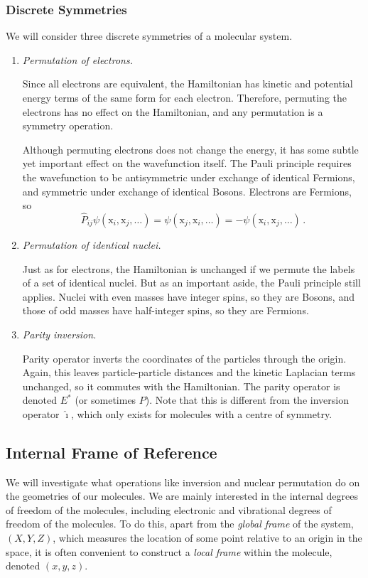 \documentclass{article}
\theoremstyle{plain}\theoremheaderfont{\normalfont\itshape}\theorembodyfont{\rmfamily}\theoremseparator{.}\newtheorem*{rem}{Remark}\newtheorem*{ex}{Example}\newtheorem*{proof}{Proof}\newtheorem*{altp}{Alternative proof}
\theoremstyle{plain}\theoremheaderfont{\normalfont\bfseries}\theorembodyfont{\rmfamily}\theoremseparator{.}\newtheorem{thm}{Theorem}[section]\newtheorem{lem}[thm]{Lemma}\newtheorem{prop}[thm]{Proposition}\newtheorem*{cor}{Corollary}\newtheorem{defn}[thm]{Definition}\newtheorem{clm}[thm]{Claim}\newtheorem{clminproof}{Claim}\newtheorem*{law}{Law}\newtheorem{pos}[thm]{Postulate}
\theoremstyle{break}\theoremheaderfont{\normalfont\itshape}\theorembodyfont{\rmfamily}\theoremseparator{.\medskip}\newtheorem*{proofskip}{Proof}\newtheorem*{exs}{Examples}\newtheorem*{rems}{Remarks}
\theoremstyle{break}\theoremheaderfont{\normalfont\bfseries}\theorembodyfont{\rmfamily}\theoremseparator{.\medskip}\newtheorem{lemskip}[thm]{Lemma}\newtheorem{defnskip}[thm]{Definition}\newtheorem{propskip}[thm]{Proposition}\newtheorem{thmskip}[thm]{Theorem}
\numberwithin{equation}{section}
\newcommand{\vb}[1]{\bm{\mathrm{#1}}}
\begin{document}
    \subsubsection{Discrete Symmetries}
    We will consider three discrete symmetries of a molecular system.
    \begin{enumerate}[topsep=0pt,label=(\roman*)]
        \item \textit{Permutation of electrons.}
        
        Since all electrons are equivalent, the Hamiltonian has kinetic and potential energy terms of the same form for each electron. Therefore, permuting the electrons has no effect on the Hamiltonian, and any permutation is a symmetry operation.

        Although permuting electrons does not change the energy, it has some subtle yet important effect on the wavefunction itself. The Pauli principle requires the wavefunction to be antisymmetric under exchange of identical Fermions, and symmetric under exchange of identical Bosons. Electrons are Fermions, so
        \begin{equation}
            \hat{P}_{ij}\psi(\vb{x}_i,\vb{x}_j,\dots)=\psi(\vb{x}_j,\vb{x}_i,\dots)=-\psi(\vb{x}_i,\vb{x}_j,\dots)\,.
        \end{equation}

        \item \textit{Permutation of identical nuclei.}
        
        Just as for electrons, the Hamiltonian is unchanged if we permute the labels of a set of identical nuclei. But as an important aside, the Pauli principle still applies. Nuclei with even masses have integer spins, so they are Bosons, and those of odd masses have half-integer spins, so they are Fermions.

        \item \textit{Parity inversion.}
        
        Parity operator inverts the coordinates of the particles through the origin. Again, this leaves particle-particle distances and the kinetic Laplacian terms unchanged, so it commutes with the Hamiltonian. The parity operator is denoted \(E^*\) (or sometimes \(P\)). Note that this is different from the inversion operator \(\hat{\imath}\), which only exists for molecules with a centre of symmetry.
    \end{enumerate}

    \subsection{Internal Frame of Reference}
    We will investigate what operations like inversion and nuclear permutation do on the geometries of our molecules. We are mainly interested in the internal degrees of freedom of the molecules, including electronic and vibrational degrees of freedom of the molecules. To do this, apart from the \textit{global frame} of the system, \((X,Y,Z)\), which measures the location of some point relative to an origin in the space, it is often convenient to construct a \textit{local frame} within the molecule, denoted \((x,y,z)\).
\end{document}
